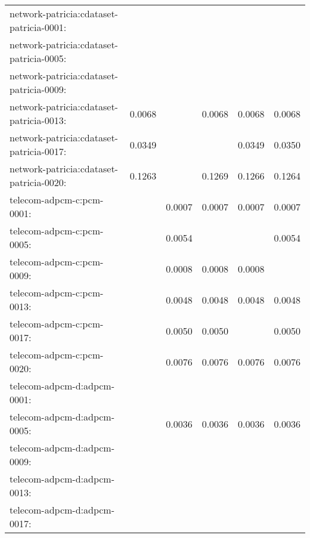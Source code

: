 \begin{longtable}{lrrrrr}
network-patricia:cdataset-patricia-0001: & \color{Green}{0.0001} & \color{Green}{0.0001} & \color{Green}{0.0001} & \color{Green}{0.0001} & \color{Green}{0.0001} \\
network-patricia:cdataset-patricia-0005: & \color{Green}{0.0003} & \color{Green}{0.0003} & \color{Green}{0.0003} & \color{Green}{0.0003} & \color{Green}{0.0003} \\
network-patricia:cdataset-patricia-0009: & \color{Green}{0.0014} & \color{Green}{0.0014} & \color{Green}{0.0014} & \color{Green}{0.0014} & \color{Green}{0.0014} \\
network-patricia:cdataset-patricia-0013: & 0.0068 & \color{Green}{0.0067} & 0.0068 & 0.0068 & 0.0068 \\
network-patricia:cdataset-patricia-0017: & 0.0349 & \color{Green}{0.0347} & \color{Green}{0.0347} & 0.0349 & 0.0350 \\
network-patricia:cdataset-patricia-0020: & 0.1263 & \color{Green}{0.1253} & 0.1269 & 0.1266 & 0.1264 \\
telecom-adpcm-c:pcm-0001: & \color{Green}{0.0006} & 0.0007 & 0.0007 & 0.0007 & 0.0007 \\
telecom-adpcm-c:pcm-0005: & \color{Green}{0.0053} & 0.0054 & \color{Green}{0.0053} & \color{Green}{0.0053} & 0.0054 \\
telecom-adpcm-c:pcm-0009: & \color{Green}{0.0007} & 0.0008 & 0.0008 & 0.0008 & \color{Green}{0.0007} \\
telecom-adpcm-c:pcm-0013: & \color{Green}{0.0047} & 0.0048 & 0.0048 & 0.0048 & 0.0048 \\
telecom-adpcm-c:pcm-0017: & \color{Green}{0.0049} & 0.0050 & 0.0050 & \color{Green}{0.0049} & 0.0050 \\
telecom-adpcm-c:pcm-0020: & \color{Green}{0.0074} & 0.0076 & 0.0076 & 0.0076 & 0.0076 \\
telecom-adpcm-d:adpcm-0001: & \color{Green}{0.0004} & \color{Green}{0.0004} & \color{Green}{0.0004} & \color{Green}{0.0004} & \color{Green}{0.0004} \\
telecom-adpcm-d:adpcm-0005: & \color{Green}{0.0035} & 0.0036 & 0.0036 & 0.0036 & 0.0036 \\
telecom-adpcm-d:adpcm-0009: & \color{Green}{0.0005} & \color{Green}{0.0005} & \color{Green}{0.0005} & \color{Green}{0.0005} & \color{Green}{0.0005} \\
telecom-adpcm-d:adpcm-0013: & \color{Green}{0.0033} & \color{Green}{0.0033} & \color{Green}{0.0033} & \color{Green}{0.0033} & \color{Green}{0.0033} \\
telecom-adpcm-d:adpcm-0017: & \color{Green}{0.0033} & \color{Green}{0.0033} & \color{Green}{0.0033} & \color{Green}{0.0033} & \color{Green}{0.0033} \\

\end{longtable}
